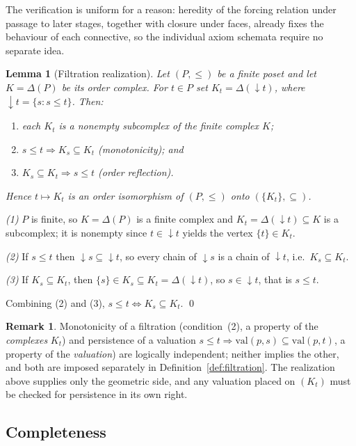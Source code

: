 \documentclass[final,12pt]{elsarticle}
\theoremstyle{plain}
\newtheorem{lem}[thm]{Lemma}
\theoremstyle{definition}
\newtheorem{rem}[thm]{Remark}
\begin{document}
The verification is uniform for a reason: heredity of the forcing relation under
passage to later stages, together with closure under faces, already fixes the
behaviour of each connective, so the individual axiom schemata require no
separate idea.

\begin{lem}[Filtration realization]
\label{lem:filtration-realization}
Let \((P,\le)\) be a finite poset and let \(K=\Delta(P)\) be its order complex.
For \(t\in P\) set \(K_t=\Delta(\downarrow t)\), where
\(\downarrow t=\{s:s\le t\}\). Then:
\begin{enumerate}
\item each \(K_t\) is a nonempty subcomplex of the finite complex \(K\);
\item \(s\le t\Rightarrow K_s\subseteq K_t\) (monotonicity); and
\item \(K_s\subseteq K_t\Rightarrow s\le t\) (order reflection).
\end{enumerate}
Hence \(t\mapsto K_t\) is an order isomorphism of \((P,\le)\) onto
\((\{K_t\},\subseteq)\).
\end{lem}

\proof
\emph{(1)} \(P\) is finite, so \(K=\Delta(P)\) is a finite complex and
\(K_t=\Delta(\downarrow t)\subseteq K\) is a subcomplex; it is nonempty since
\(t\in\downarrow t\) yields the vertex \(\{t\}\in K_t\).

\emph{(2)} If \(s\le t\) then \(\downarrow s\subseteq\downarrow t\), so every chain
of \(\downarrow s\) is a chain of \(\downarrow t\), i.e.\ \(K_s\subseteq K_t\).

\emph{(3)} If \(K_s\subseteq K_t\), then \(\{s\}\in K_s\subseteq
K_t=\Delta(\downarrow t)\), so \(s\in\downarrow t\), that is \(s\le t\).

Combining (2) and (3), \(s\le t\iff K_s\subseteq K_t\).
\qed

\begin{rem}
Monotonicity of a filtration (condition~(2), a property of the \emph{complexes}
\(K_t\)) and persistence of a valuation
\(s\le t\Rightarrow\mathrm{val}(p,s)\subseteq\mathrm{val}(p,t)\), a property of the
\emph{valuation}) are logically independent; neither implies the other, and both
are imposed separately in Definition~\ref{def:filtration}. The realization above
supplies only the geometric side, and any valuation placed on \((K_t)\) must be
checked for persistence in its own right.
\end{rem}

\subsection{Completeness}
\label{subsec:completeness}
\end{document}
